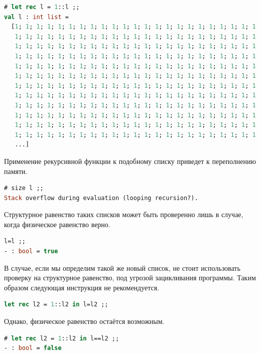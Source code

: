 \begin{lstlisting}[language=OCaml]
# let rec l = 1::l ;;
val l : int list =
  [1; 1; 1; 1; 1; 1; 1; 1; 1; 1; 1; 1; 1; 1; 1; 1; 1; 1; 1; 1; 1; 1; 1; 1; 1;
   1; 1; 1; 1; 1; 1; 1; 1; 1; 1; 1; 1; 1; 1; 1; 1; 1; 1; 1; 1; 1; 1; 1; 1; 1;
   1; 1; 1; 1; 1; 1; 1; 1; 1; 1; 1; 1; 1; 1; 1; 1; 1; 1; 1; 1; 1; 1; 1; 1; 1;
   1; 1; 1; 1; 1; 1; 1; 1; 1; 1; 1; 1; 1; 1; 1; 1; 1; 1; 1; 1; 1; 1; 1; 1; 1;
   1; 1; 1; 1; 1; 1; 1; 1; 1; 1; 1; 1; 1; 1; 1; 1; 1; 1; 1; 1; 1; 1; 1; 1; 1;
   1; 1; 1; 1; 1; 1; 1; 1; 1; 1; 1; 1; 1; 1; 1; 1; 1; 1; 1; 1; 1; 1; 1; 1; 1;
   1; 1; 1; 1; 1; 1; 1; 1; 1; 1; 1; 1; 1; 1; 1; 1; 1; 1; 1; 1; 1; 1; 1; 1; 1;
   1; 1; 1; 1; 1; 1; 1; 1; 1; 1; 1; 1; 1; 1; 1; 1; 1; 1; 1; 1; 1; 1; 1; 1; 1;
   1; 1; 1; 1; 1; 1; 1; 1; 1; 1; 1; 1; 1; 1; 1; 1; 1; 1; 1; 1; 1; 1; 1; 1; 1;
   1; 1; 1; 1; 1; 1; 1; 1; 1; 1; 1; 1; 1; 1; 1; 1; 1; 1; 1; 1; 1; 1; 1; 1; 1;
   1; 1; 1; 1; 1; 1; 1; 1; 1; 1; 1; 1; 1; 1; 1; 1; 1; 1; 1; 1; 1; 1; 1; 1; 1;
   1; 1; 1; 1; 1; 1; 1; 1; 1; 1; 1; 1; 1; 1; 1; 1; 1; 1; 1; 1; 1; 1; 1; 1;
   ...]
\end{lstlisting}

Применение рекурсивной функции к подобному списку приведет к переполнению
памяти.

\begin{lstlisting}[language=OCaml]
# size l ;;
Stack overflow during evaluation (looping recursion?).
\end{lstlisting}

Структурное равенство таких списков может быть проверенно лишь в случае, когда
физическое равенство верно.

\begin{lstlisting}[language=OCaml]
l=l ;;
- : bool = true
\end{lstlisting}

В случае, если мы определим такой же новый список, не стоит использовать
проверку на структурное равенство, под угрозой зацикливания программы. Таким
образом следующая инструкция не рекомендуется.

\begin{lstlisting}[language=OCaml]
let rec l2 = 1::l2 in l=l2 ;;
\end{lstlisting}

Однако, физическое равенство остаётся возможным.

\begin{lstlisting}[language=OCaml]
# let rec l2 = 1::l2 in l==l2 ;;
- : bool = false
\end{lstlisting}

